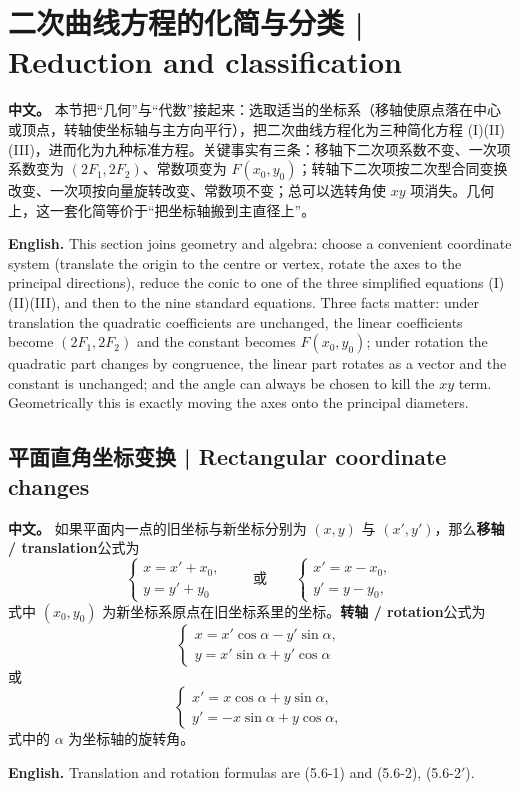\documentclass[UTF8,11pt,a4paper]{ctexart}
\newcommand{\APS}[2]{\par\noindent\textbf{中文。} #1\par\noindent\textbf{English.} #2\par\smallskip}
\theoremstyle{definition}
\begin{document}
\section{\label{sec:14}二次曲线方程的化简与分类 | Reduction and classification}
\APS{本节把``几何''与``代数''接起来：选取适当的坐标系（移轴使原点落在中心或顶点，转轴使坐标轴与主方向平行），把二次曲线方程化为三种简化方程 (I)(II)(III)，进而化为九种标准方程。关键事实有三条：移轴下二次项系数不变、一次项系数变为 $(2F_1,2F_2)$、常数项变为 $F(x_0,y_0)$；转轴下二次项按二次型合同变换改变、一次项按向量旋转改变、常数项不变；总可以选转角使 $xy$ 项消失。几何上，这一套化简等价于``把坐标轴搬到主直径上''。}{This section joins geometry and algebra: choose a convenient coordinate system (translate the origin to the centre or vertex, rotate the axes to the principal directions), reduce the conic to one of the three simplified equations (I)(II)(III), and then to the nine standard equations. Three facts matter: under translation the quadratic coefficients are unchanged, the linear coefficients become $(2F_1,2F_2)$ and the constant becomes $F(x_0,y_0)$; under rotation the quadratic part changes by congruence, the linear part rotates as a vector and the constant is unchanged; and the angle can always be chosen to kill the $xy$ term. Geometrically this is exactly moving the axes onto the principal diameters.}

\subsection{平面直角坐标变换 | Rectangular coordinate changes}
\APS{如果平面内一点的旧坐标与新坐标分别为 $(x,y)$ 与 $(x',y')$，那么\textbf{移轴 / translation}公式为
\[
\begin{cases}x=x'+x_0,\\ y=y'+y_0\end{cases}\qquad\text{或}\qquad
\begin{cases}x'=x-x_0,\\ y'=y-y_0,\end{cases}\tag{5.6-1}
\]
式中 $(x_0,y_0)$ 为新坐标系原点在旧坐标系里的坐标。\textbf{转轴 / rotation}公式为
\[
\begin{cases}x=x'\cos\alpha-y'\sin\alpha,\\ y=x'\sin\alpha+y'\cos\alpha\end{cases}\tag{5.6-2}
\]
或
\[
\begin{cases}x'=x\cos\alpha+y\sin\alpha,\\ y'=-x\sin\alpha+y\cos\alpha,\end{cases}\tag{5.6-2$'$}
\]
式中的 $\alpha$ 为坐标轴的旋转角。}{Translation and rotation formulas are (5.6-1) and (5.6-2), (5.6-2$'$).}
\end{document}
